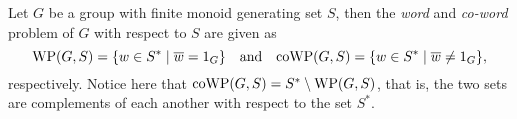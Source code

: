 Let $G$ be a group with finite monoid generating set $S$, then the \emph{word} and \emph{co-word} problem of $G$ with respect to $S$ are given as
\[
	\mathrm{WP}(G,S) = \{ w \in S^* \mid \overline{w} = 1_G \}
	\quad\text{and}\quad
	\mathrm{coWP}(G,S) = \{ w \in S^* \mid \overline{w} \neq 1_G \},
\]
respectively.
Notice here that $\mathrm{coWP}(G,S) = S^* \setminus \mathrm{WP}(G,S)$, that is, the two sets are complements of each another with respect to the set $S^*$.
